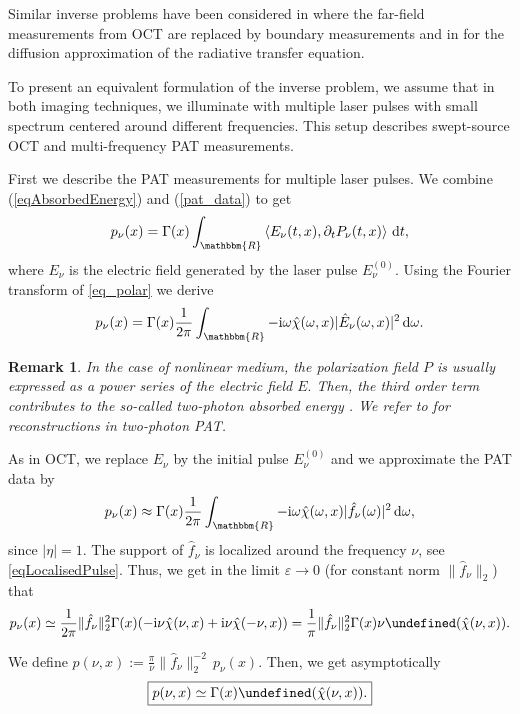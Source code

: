 \documentclass[a4paper,twoside,10pt]{article}
\theoremstyle{break}
\newtheorem{remark}[remark]{Remark}
\theoremstyle{nonumberplain}
\newcommand{\R}{\mathbbm{R}}
\renewcommand{\i}{\mathrm i}
\renewcommand{\d}{\,\mathrm d}
\let\IM\Im
\let\Im=\undefined
\DeclareMathOperator{\Im}{\IM m}
\begin{document}
Similar inverse problems have been considered in \cite{BalRenUhlZho11, BalZho14} where the far-field measurements from OCT are replaced by boundary measurements and in \cite{BalUhl12} for the diffusion approximation of the radiative transfer equation.

To present an equivalent formulation of the inverse problem, we assume that in both imaging techniques, we illuminate with multiple laser pulses with small spectrum centered around different frequencies. This setup describes swept-source OCT and multi-frequency PAT measurements.

 First we describe the PAT measurements for multiple laser pulses. We
combine (\ref{eqAbsorbedEnergy})
and  (\ref{pat_data}) to get
\[ 
p_\nu (x) = \Gamma(x)\int_\R \left<E_\nu(t,x),\partial_t P_\nu(t,x)\right>\d t , 
\]
where $E_\nu$ is the electric field generated by the laser pulse $E^{(0)}_\nu .$ Using the Fourier transform of \eqref{eq_polar} we derive 
\begin{equation*}%
p_\nu(x)=\Gamma(x)\frac1{2\pi} \int_\R -\i\omega \hat\chi(\omega, x)|\hat E_\nu(\omega,x)|^2\d\omega.
\end{equation*}

\begin{remark}
In the case of nonlinear medium, the polarization field $P$ is usually expressed as a power series of the electric field $E.$ Then, the third order term contributes to the so-called two-photon absorbed energy \cite{Fri82}. We refer to \cite{RenZha16} for reconstructions in two-photon PAT.
\end{remark}

As in OCT, we replace $E_\nu$ by the initial pulse $E_\nu^{(0)}$ and  we approximate the PAT data by 
\[
 p_\nu(x) \approx \Gamma(x)\frac1{2\pi} \int_\R -\i\omega \hat\chi(\omega, x)|\hat f_\nu (\omega)|^2\d\omega, 
 \]
since $|
\eta |=1.$  The support of $\hat f_\nu$ is localized around the frequency $\nu$, see \eqref{eqLocalisedPulse}. Thus, we get in the limit $\varepsilon\to0$ (for constant norm $\|\hat f_\nu\|_2$) that
\begin{equation*}
p_\nu(x) \simeq \frac1{2\pi}\|\hat  f_\nu\|_2^2\Gamma(x)(-\i\nu \hat\chi(\nu,x)+\i \nu \hat\chi (-\nu,x)) = \frac1{\pi}\|\hat f_\nu\|_2^2 \Gamma(x) \nu \Im(\hat\chi(\nu,x)).
\end{equation*}

We define $p ( \nu , x) := \frac{\pi}{\nu} \|\hat f_\nu \|_2^{-2} \, p_\nu (x).$ Then, we get asymptotically
\begin{equation}\label{eqPATOCTmeasSimplified}
\boxed{p(\nu ,x) \simeq \Gamma(x)  \Im(\hat\chi(\nu ,x)). }
\end{equation}
\end{document}
